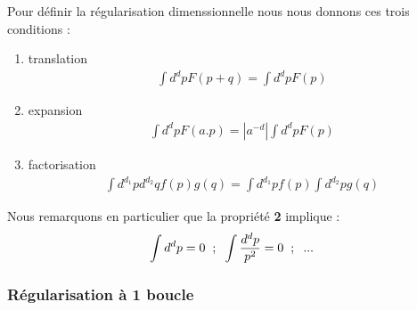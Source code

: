 \documentclass[a4paper,11pt]{article}
\theoremstyle{plain}
\theoremstyle{definition}
\theoremstyle{remark}
\numberwithin{equation}{section}
\numberwithin{equation}{subsection}
\numberwithin{figure}{section}
\begin{document}
\noindent
Pour définir la régularisation dimenssionnelle nous nous donnons ces trois conditions :
\begin{enumerate}
\item translation
          \begin{eqnarray}
           \int d^{d}p F(p+q) = \int d^{d}p F(p)
          \end{eqnarray}
\item expansion
          \begin{eqnarray}
           \int d^{d}p F(a.p) = |a^{-d} | \int d^{d}p F(p)
          \end{eqnarray}
\item factorisation
          \begin{eqnarray}
           \int d^{d_1}p d^{d_2}q f(p) g(q) = \int d^{d_1}p f(p)  \int d^{d_2}p g(q)
          \end{eqnarray}
\end{enumerate}

\noindent
Nous remarquons en particulier que la propriété  \textbf{2} implique :
\begin{eqnarray}
 \int d^{d}p = 0 \hspace{2mm} ;  \hspace{2mm} \int \frac{d^{d}p}{p^2} = 0 \hspace{2mm} ;  \hspace{2mm} ...
\end{eqnarray}

\subsubsection{Régularisation à 1 boucle}
\end{document}
